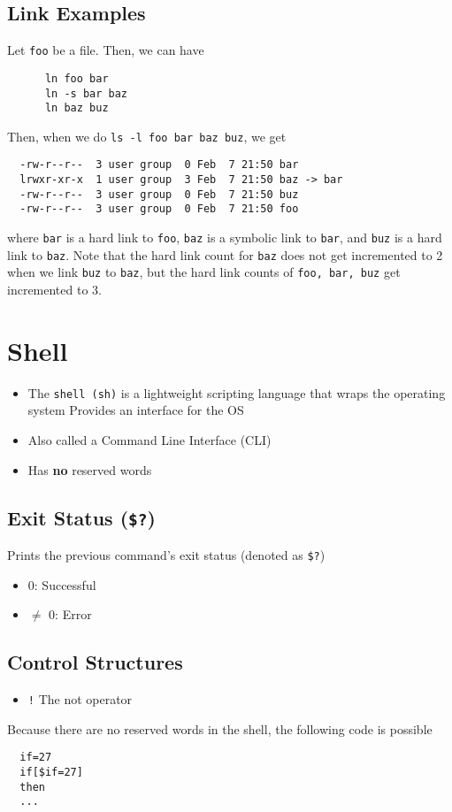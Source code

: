 \documentclass[13pt]{article}
\begin{document}
\subsection{Link Examples}
Let \texttt{foo} be a file. Then, we can have
\begin{verbatim}
      ln foo bar
      ln -s bar baz
      ln baz buz \end{verbatim}
    Then, when we do \texttt{ls -l foo bar baz buz}, we get
\begin{verbatim}
  -rw-r--r--  3 user group  0 Feb  7 21:50 bar
  lrwxr-xr-x  1 user group  3 Feb  7 21:50 baz -> bar
  -rw-r--r--  3 user group  0 Feb  7 21:50 buz
  -rw-r--r--  3 user group  0 Feb  7 21:50 foo \end{verbatim}
where \texttt{bar} is a hard link to \texttt{foo}, \texttt{baz} is a symbolic link to \texttt{bar}, and \texttt{buz} is a hard link to \texttt{baz}. Note that the hard link count for \texttt{baz} does not get incremented to 2 when we link \texttt{buz} to \texttt{baz}, but the hard link counts of \texttt{foo, bar, buz} get incremented to 3.

\section{Shell}
\begin{itemize}[leftmargin = 0pt]
\item [] The \texttt{shell (sh)} is a lightweight scripting language that wraps the operating system
  \subitem Provides an interface for the OS
\item [] Also called a Command Line Interface (CLI)
\item [] Has \textbf{no} reserved words
\end{itemize}

\subsection{Exit Status (\texttt{\$?})}
Prints the previous command's exit status (denoted as \texttt{\$?})
\begin{itemize}[leftmargin = 0pt]
\item [] 0: Successful
\item [] $\neq$ 0: Error
\end{itemize}

\subsection{Control Structures}
\begin{itemize}[leftmargin = 0pt]
\item [] \texttt{!} The not operator
\end{itemize}
Because there are no reserved words in the shell, the following code is possible
\begin{verbatim}
  if=27
  if[$if=27]
  then
  ... \end{verbatim}
\end{document}
